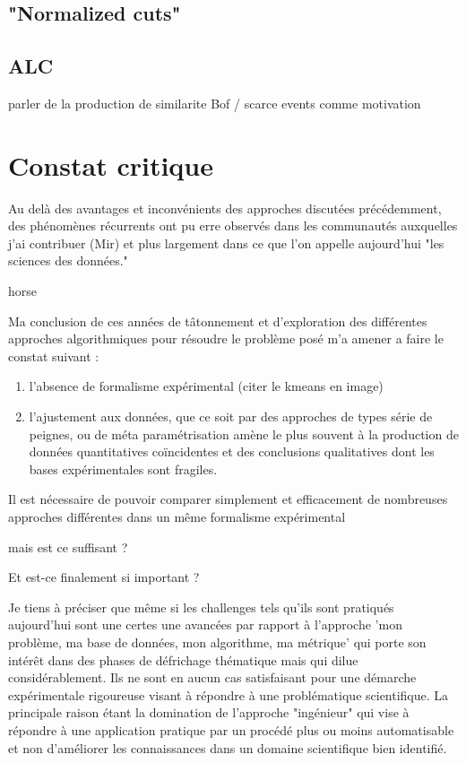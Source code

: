 \subsection{"Normalized cuts"}

\subsection{ALC}

parler de la production de similarite Bof / scarce events comme motivation



\section{Constat critique}

Au delà des avantages et inconvénients des approches discutées précédemment, des phénomènes récurrents ont pu erre observés dans les communautés auxquelles j'ai contribuer (Mir) et plus largement dans ce que l'on appelle aujourd'hui "les sciences des données."

horse

Ma conclusion de ces années de tâtonnement et d'exploration des différentes approches algorithmiques pour résoudre le problème posé m'a amener a faire le constat suivant :
\begin{enumerate}
  \item l'absence de formalisme expérimental (citer le kmeans en image)
  \item l'ajustement aux données, que ce soit par des approches de types série de peignes, ou de méta paramétrisation amène le plus souvent à la production de données quantitatives coïncidentes et des conclusions qualitatives dont les bases expérimentales sont fragiles.

\end{enumerate}

 Il est nécessaire de pouvoir comparer simplement et efficacement de nombreuses approches différentes dans un même formalisme expérimental

 mais est ce suffisant ?

 Et est-ce finalement si important ?


Je tiens à préciser que même si les challenges tels qu'ils sont pratiqués aujourd'hui sont une certes une avancées par rapport à l'approche 'mon problème, ma base de données, mon algorithme, ma métrique' qui porte son intérêt dans des phases de défrichage thématique mais qui dilue considérablement. Ils  ne sont en aucun cas satisfaisant pour une démarche expérimentale rigoureuse visant à répondre à une problématique scientifique. La principale raison étant la domination de l'approche "ingénieur" qui vise à répondre à une application pratique par un procédé plus ou moins automatisable et non d'améliorer les connaissances dans un domaine scientifique bien identifié.



